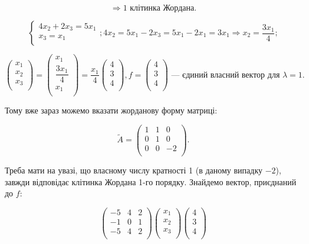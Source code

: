 $$\Rightarrow 1 \text{ клітинка Жордана.}$$

$$\left\{ \begin{matrix}
	4x_2 + 2 x_3 = 5x_1 \\
	x_3 = x_1 \\
\end{matrix} \right.; 4x_2 = 5x_1 - 2x_3 = 5x_1 -2 x_1 = 3x_1 \Rightarrow x_2 = \dfrac{3x_1}{4};$$

$$\begin{pmatrix}
	x_1 \\
	x_2 \\
	x_3 \\
\end{pmatrix} = \begin{pmatrix}
	x_1 \\
	\dfrac{3x_1}{4} \\
	x_1 \\
\end{pmatrix} = \dfrac{x_1}{4} \begin{pmatrix}
	4 \\
	3 \\
	4 \\
\end{pmatrix}, f = \begin{pmatrix}
	4 \\
	3 \\
	4 \\
\end{pmatrix} \text{ --- єдиний власний вектор для } \lambda = 1.$$


Тому вже зараз можемо вказати жорданову форму матриці: 

$$\tilde{A} = \begin{pmatrix}
	1 & 1 & 0 \\
	0 & 1 & 0 \\
	0 & 0 & -2 \\
\end{pmatrix}.$$

Треба мати на увазі, що власному числу кратності 1 (в даному випадку $-2$),
завжди відповідає клітинка Жордана 1-го порядку.
Знайдемо вектор, приєднаний до $f$:

$$\begin{pmatrix}
	-5 & 4 & 2 \\
	-1 & 0 & 1 \\
	-5 & 4 & 2 \\
\end{pmatrix} \begin{pmatrix}
	x_1 \\
	x_2 \\
	x_3 \\
\end{pmatrix}\begin{pmatrix}
	4 \\
	3 \\
	4 \\
\end{pmatrix} $$

